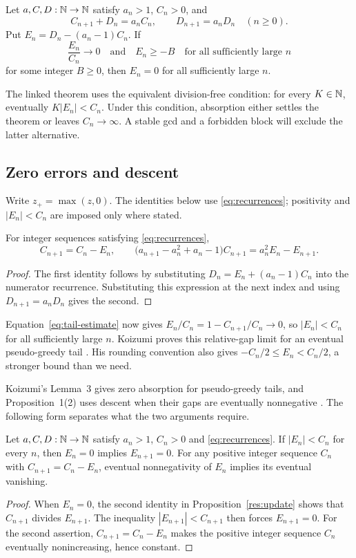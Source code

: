 \documentclass[11pt]{article}
\begin{document}
\begin{theorem}\label{res:bounded}
Let $a,C,D:\mathbb{N}\to\mathbb{N}$ satisfy $a_n>1$, $C_n>0$, and
\[
 C_{n+1}+D_n=a_nC_n,\qquad D_{n+1}=a_nD_n
 \quad(n\ge0).
\]
Put $E_n=D_n-(a_n-1)C_n$. If
\[
 \frac{E_n}{C_n}\longrightarrow0
 \quad\text{and}\quad E_n\ge-B\quad\text{for all sufficiently large }n
\]
for some integer $B\ge0$, then $E_n=0$ for all sufficiently large $n$.
\end{theorem}
The linked theorem uses the equivalent division-free condition:
for every $K\in\mathbb{N}$, eventually $K|E_n|<C_n$. Under this condition,
absorption either settles the theorem or leaves $C_n\to\infty$.
A stable gcd and a forbidden block will exclude the latter alternative.

\subsection{Zero errors and descent}\label{sec:defect}\label{sec:descent}
Write $z_+=\max(z,0)$. The identities below use
\eqref{eq:recurrences}; positivity and $|E_n|<C_n$ are imposed only
where stated.

\begin{proposition}\label{res:update}\label{res:defect}
For integer sequences satisfying \eqref{eq:recurrences},
\[
 C_{n+1}=C_n-E_n,\qquad
 \bigl(a_{n+1}-a_n^2+a_n-1\bigr)C_{n+1}=a_n^2E_n-E_{n+1}.
\]
\end{proposition}
\begin{proof}
The first identity follows by substituting $D_n=E_n+(a_n-1)C_n$
into the numerator recurrence. Substituting this expression at the
next index and using $D_{n+1}=a_nD_n$ gives the second.
\end{proof}

Equation~\eqref{eq:tail-estimate} now gives
$E_n/C_n=1-C_{n+1}/C_n\to0$, so $|E_n|<C_n$ for all sufficiently large $n$.
Koizumi proves this relative-gap limit for an eventual pseudo-greedy
tail \cite[Corollary~3, p.~9]{koizumi2025}. His rounding convention
also gives $-C_n/2\le E_n<C_n/2$, a stronger bound than we need.

Koizumi's Lemma~3 gives zero absorption for pseudo-greedy tails, and
Proposition~1(2) uses descent when their gaps are eventually nonnegative
\cite[p.~10 and p.~14]{koizumi2025}. The following form separates
what the two arguments require.

\begin{theorem}\label{res:absorb}\label{res:descent}
Let $a,C,D:\mathbb{N}\to\mathbb{N}$ satisfy $a_n>1$, $C_n>0$ and
\eqref{eq:recurrences}. If $|E_n|<C_n$ for every $n$, then $E_n=0$
implies $E_{n+1}=0$. For any positive integer sequence $C_n$ with
$C_{n+1}=C_n-E_n$, eventual nonnegativity of $E_n$ implies its eventual
vanishing.
\end{theorem}
\begin{proof}
When $E_n=0$, the second identity in Proposition~\ref{res:update}
shows that $C_{n+1}$ divides $E_{n+1}$. The inequality
$|E_{n+1}|<C_{n+1}$ then forces $E_{n+1}=0$. For the second assertion,
$C_{n+1}=C_n-E_n$ makes the positive integer sequence $C_n$ eventually
nonincreasing, hence constant.
\end{proof}
\end{document}
